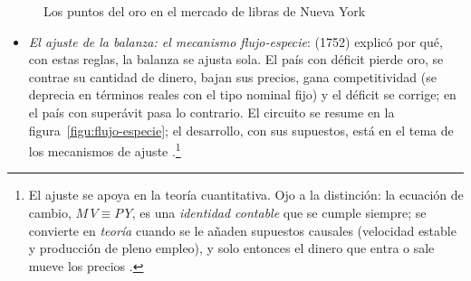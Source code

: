 \documentclass[11pt]{article}
\begin{document}
\begin{figure}[H]
\centering
\caption{Los puntos del oro en el mercado de libras de Nueva York}\label{fig:puntos-oro}
\end{figure}

\begin{itemize}
\item \emph{El ajuste de la balanza: el mecanismo flujo-especie}:  (1752) explicó por qué, con estas reglas, la balanza se ajusta sola\nocite{Hume1752Balance}. El país con déficit pierde oro, se contrae su cantidad de dinero, bajan sus precios, gana competitividad (se deprecia en términos reales con el tipo nominal fijo) y el déficit se corrige; en el país con superávit pasa lo contrario. El circuito se resume en la figura~\ref{figu:flujo-especie}; el desarrollo, con sus supuestos, está en el tema de los mecanismos de ajuste .\footnote{El ajuste se apoya en la teoría cuantitativa. Ojo a la distinción: la ecuación de cambio, $M\,V\equiv P\,Y$, es una \emph{identidad contable} que se cumple siempre; se convierte en \emph{teoría} cuando se le añaden supuestos causales (velocidad estable y producción de pleno empleo), y solo entonces el dinero que entra o sale mueve los precios .}
\end{itemize}
\begin{infografia}[H]
\centering
\caption{El mecanismo flujo-especie de }\label{figu:flujo-especie}
\end{infografia}
\end{document}
